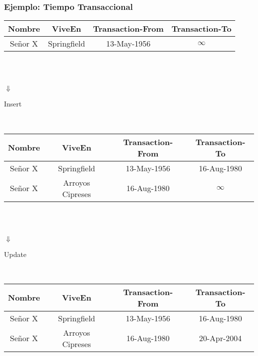 \documentclass[12pt]{beamer}
\begin{document}
\begin{frame}
\frametitle{Ejemplo: Tiempo Transaccional}
\begin{center}
\begin{tabular}{|c|c|c|c|}
\hline
Nombre & ViveEn & Transaction-From & Transaction-To\\
\hline
Se\~nor X & Springfield & 13-May-1956 & $\infty$\\
\hline
\end{tabular}
\\
\ \\
\begin{Huge}{$\Downarrow$}\end{Huge}\begin{small}{Insert}\end{small}\\
\begin{tabular}{|c|c|c|c|}
\hline
Nombre & ViveEn & Transaction-From & Transaction-To\\
\hline
Se\~nor X & Springfield & 13-May-1956 & 16-Aug-1980\\
\hline
Se\~nor X & Arroyos Cipreses & 16-Aug-1980 & $\infty$\\
\hline
\end{tabular}
\\
\ \\
\begin{Huge}{$\Downarrow$}\end{Huge}\begin{small}{Update}\end{small}\\
\begin{tabular}{|c|c|c|c|}
\hline
Nombre & ViveEn & Transaction-From & Transaction-To\\
\hline
Se\~nor X & Springfield & 13-May-1956 & 16-Aug-1980\\
\hline
Se\~nor X & Arroyos Cipreses & 16-Aug-1980 & 20-Apr-2004\\
\hline
\end{tabular}

\end{center}
\end{frame}
\end{document}
